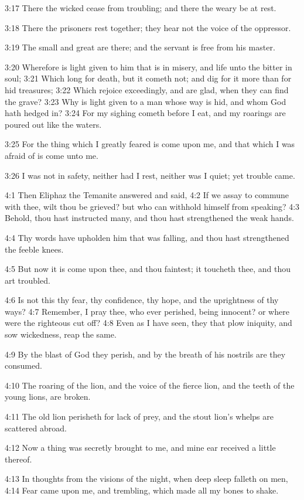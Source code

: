 3:17 There the wicked cease from troubling; and there the weary be at rest.

3:18 There the prisoners rest together; they hear not the voice of the oppressor.

3:19 The small and great are there; and the servant is free from his master.

3:20 Wherefore is light given to him that is in misery, and life unto the bitter in soul; 3:21 Which long for death, but it cometh not; and dig for it more than for hid treasures; 3:22 Which rejoice exceedingly, and are glad, when they can find the grave?  3:23 Why is light given to a man whose way is hid, and whom God hath hedged in?  3:24 For my sighing cometh before I eat, and my roarings are poured out like the waters.

3:25 For the thing which I greatly feared is come upon me, and that which I was afraid of is come unto me.

3:26 I was not in safety, neither had I rest, neither was I quiet; yet trouble came.

4:1 Then Eliphaz the Temanite answered and said, 4:2 If we assay to commune with thee, wilt thou be grieved? but who can withhold himself from speaking?  4:3 Behold, thou hast instructed many, and thou hast strengthened the weak hands.

4:4 Thy words have upholden him that was falling, and thou hast strengthened the feeble knees.

4:5 But now it is come upon thee, and thou faintest; it toucheth thee, and thou art troubled.

4:6 Is not this thy fear, thy confidence, thy hope, and the uprightness of thy ways?  4:7 Remember, I pray thee, who ever perished, being innocent? or where were the righteous cut off?  4:8 Even as I have seen, they that plow iniquity, and sow wickedness, reap the same.

4:9 By the blast of God they perish, and by the breath of his nostrils are they consumed.

4:10 The roaring of the lion, and the voice of the fierce lion, and the teeth of the young lions, are broken.

4:11 The old lion perisheth for lack of prey, and the stout lion's whelps are scattered abroad.

4:12 Now a thing was secretly brought to me, and mine ear received a little thereof.

4:13 In thoughts from the visions of the night, when deep sleep falleth on men, 4:14 Fear came upon me, and trembling, which made all my bones to shake.

